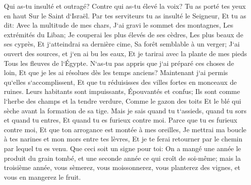 \verse Qui as-tu insulté et outragé? Contre qui as-tu élevé la voix? Tu as porté tes yeux en haut Sur le Saint d`Israël. 
\verse Par tes serviteurs tu as insulté le Seigneur, Et tu as dit: Avec la multitude de mes chars, J`ai gravi le sommet des montagnes, Les extrémités du Liban; Je couperai les plus élevés de ses cèdres, Les plus beaux de ses cyprès, Et j`atteindrai sa dernière cime, Sa forêt semblable à un verger; 
\verse J`ai ouvert des sources, et j`en ai bu les eaux, Et je tarirai avec la plante de mes pieds Tous les fleuves de l`Égypte. 
\verse N`as-tu pas appris que j`ai préparé ces choses de loin, Et que je les ai résolues dès les temps anciens? Maintenant j`ai permis qu`elles s`accomplissent, Et que tu réduisisses des villes fortes en monceaux de ruines. 
\verse Leurs habitants sont impuissants, Épouvantés et confus; Ils sont comme l`herbe des champs et la tendre verdure, Comme le gazon des toits Et le blé qui sèche avant la formation de sa tige. 
\verse Mais je sais quand tu t`assieds, quand tu sors et quand tu entres, Et quand tu es furieux contre moi. 
\verse Parce que tu es furieux contre moi, Et que ton arrogance est montée à mes oreilles, Je mettrai ma boucle à tes narines et mon mors entre tes lèvres, Et je te ferai retourner par le chemin par lequel tu es venu. 
\verse Que ceci soit un signe pour toi: On a mangé une année le produit du grain tombé, et une seconde année ce qui croît de soi-même; mais la troisième année, vous sèmerez, vous moissonnerez, vous planterez des vignes, et vous en mangerez le fruit. 
